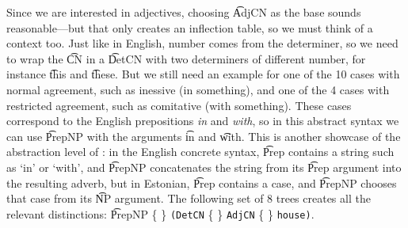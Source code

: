 \noindent Since we are interested in adjectives, choosing \t{AdjCN} as
the base sounds reasonable---but that only creates an inflection
table, so we must think of a context too. Just like in English, number
comes from the determiner, so we need to wrap the \t{CN} in a \t{DetCN}
with two determiners of different number, for instance \t{this} and
\t{these}. But we still need an example for one of the 10 cases with
normal agreement, such as inessive (in something), and one of the 4
cases with restricted agreement, such as comitative (with something).
These cases correspond to the English prepositions \emph{in} and \emph{with},
so in this abstract syntax we can use \t{PrepNP} with the arguments
\t{in} and \t{with}. This is another showcase of the abstraction level
of \gf{}: in the English concrete syntax, \t{Prep} contains a string
such as `in' or `with', and \t{PrepNP} concatenates the string from its
\t{Prep} argument into the resulting adverb, but in Estonian, \t{Prep}
contains a case, and \t{PrepNP} chooses that case from its \t{NP} argument.
The following set of 8 trees creates all the relevant
distinctions:
 \t{PrepNP} \{  \}
             {\tt (DetCN} \{  \} 
             {\tt AdjCN}  \{ \} 
             {\tt house)}.



